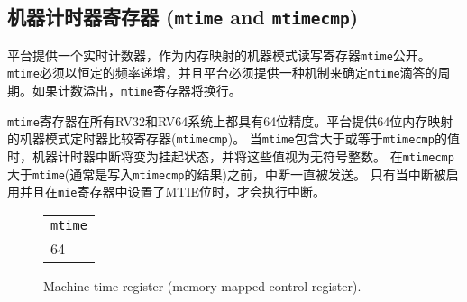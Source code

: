 {%
\subsection{机器计时器寄存器 ({\tt mtime} and {\tt mtimecmp})}

\iffalse
Platforms provide a real-time counter, exposed as a memory-mapped
machine-mode read-write register, {\tt mtime}.  {\tt mtime} must
increment at constant frequency, and the platform must provide a
mechanism for determining the period of an {\tt mtime} tick.  The {\tt
	mtime} register will wrap around if the count overflows.

The {\tt mtime} register has a 64-bit precision on all RV32 and RV64
systems.  Platforms provide a 64-bit memory-mapped machine-mode
timer compare register ({\tt mtimecmp}).
A machine timer interrupt becomes pending whenever {\tt mtime} contains
a value greater than or equal to {\tt mtimecmp}, treating the values
as unsigned integers.
The interrupt remains posted until {\tt mtimecmp} becomes greater than
{\tt mtime} (typically as a result of writing {\tt mtimecmp}).
The interrupt will only be taken if interrupts
are enabled and the MTIE bit is set in the {\tt mie} register.
\fi
平台提供一个实时计数器，作为内存映射的机器模式读写寄存器{\tt mtime}公开。{\tt mtime}必须以恒定的频率递增，并且平台必须提供一种机制来确定{\tt mtime}滴答的周期。如果计数溢出，{\tt mtime}寄存器将换行。

{\tt mtime}寄存器在所有RV32和RV64系统上都具有64位精度。平台提供64位内存映射的机器模式定时器比较寄存器({\tt mtimecmp})。
当{\tt mtime}包含大于或等于{\tt mtimecmp}的值时，机器计时器中断将变为挂起状态，并将这些值视为无符号整数。
在{\tt mtimecmp}大于{\tt mtime}(通常是写入{\tt mtimecmp}的结果)之前，中断一直被发送。
只有当中断被启用并且在{\tt mie}寄存器中设置了MTIE位时，才会执行中断。

\begin{figure}[h!]
	{\footnotesize
		\begin{center}
			\begin{tabular}{@{}J}
				 \\
				\hline
				 \\
				 \\
			\end{tabular}
		\end{center}
	}
	\vspace{-0.1in}
	\caption{Machine time register (memory-mapped control register).}
\end{figure}

}
